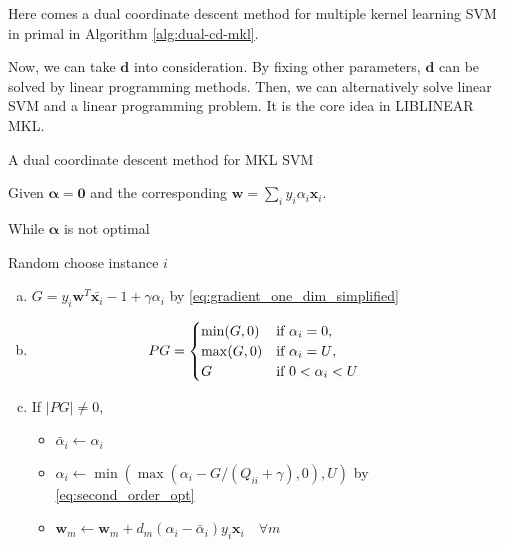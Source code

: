 \documentclass[12pt]{article}
\def\bw{{\boldsymbol w}}
\def\balpha{{\boldsymbol \alpha}}
\def\bd{{\boldsymbol d}}
\def\bzero{{\boldsymbol 0}}
\def\bx{{\boldsymbol x}}
\def\liblinear{{\sf LIBLINEAR}\xspace}
\begin{document}
	
Here comes a dual coordinate descent method for multiple kernel learning SVM in primal in Algorithm \ref{alg:dual-cd-mkl}.


Now, we can take $\bd$ into consideration. By fixing other parameters, $\bd$ can be solved by linear programming methods. Then, we can alternatively solve linear SVM and a linear programming problem. It is the core idea in \liblinear MKL.


\begin{Algorithm}
	\caption{A dual coordinate descent method for MKL SVM}
	\label{alg:dual-cd-mkl}
\begin{compactitem}
		\item Given $\balpha = \bzero$ and the corresponding $\bw= \sum_i y_i \alpha_i \bx_i$.
		\item While $\balpha$ is not optimal
			\begin{description}
				\item  Random choose instance $i$
            \begin{enumerate}[(a)]
          \item $G = y_i \bw^T \bar{\bx_i} -1 + \gamma\alpha_i$ by \eqref{eq:gradient_one_dim_simplified}
          \item \begin{equation*}
				  \hspace{-25pt}
				  PG = \begin{cases}
              \min(G,0) & \text{if $\alpha_i = 0$},\\
              \max(G,0) & \text{if $\alpha_i = U$},\\
              G & \text{if $0<\alpha_i < U$}
            \end{cases}
          \end{equation*}
        \item If $|PG| \neq 0$, \label{step:last}
          \begin{itemize}

           \item[] $\bar{\alpha}_i \leftarrow \alpha_i$ 
   		  \item[] $\alpha_i \leftarrow \min (\max (\alpha_i - G/(Q_{ii} + \gamma), 0),U )$ by \eqref{eq:second_order_opt}
					\item[]  $\bw_m \leftarrow \bw_m + d_m (\alpha_i - \bar{\alpha}_i) y_i \bx_i \quad \forall m$
          \end{itemize}

			\end{enumerate}
		\end{description}
	\end{compactitem}
\end{Algorithm}
\end{document}
